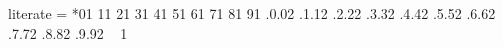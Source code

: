 {    %
    literate          =
        *{0}{{{}}}{1}
        {1}{{{}}}{1}
        {2}{{{}}}{1}
        {3}{{{}}}{1}
        {4}{{{}}}{1}
        {5}{{{}}}{1}
        {6}{{{}}}{1}
        {7}{{{}}}{1}
        {8}{{{}}}{1}
        {9}{{{}}}{1}
        {.0}{{{\codeNumericsStyle.0}}}{2}
        {.1}{{{\codeNumericsStyle.1}}}{2}
        {.2}{{{\codeNumericsStyle.2}}}{2}
        {.3}{{{\codeNumericsStyle.3}}}{2}
        {.4}{{{\codeNumericsStyle.4}}}{2}
        {.5}{{{\codeNumericsStyle.5}}}{2}
        {.6}{{{\codeNumericsStyle.6}}}{2}
        {.7}{{{\codeNumericsStyle.7}}}{2}
        {.8}{{{\codeNumericsStyle.8}}}{2}
        {.9}{{{\codeNumericsStyle.9}}}{2}
        {\ }{{ }}{1}
}

